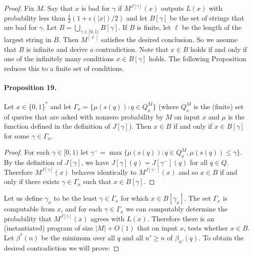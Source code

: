\documentclass[10pt,a4paper]{article}
\begin{document}
\begin{proof}
Fix $M$. Say that $x$ is bad for $\gamma$ if $M^{J[\gamma]}(x)$ outputs $L(x)$ with probability less than $\frac12(1+\epsilon(|x|)/2)$ and let $B[\gamma]$ be the set of strings that are bad for $\gamma$. Let $B=\bigcup_{\gamma\in[0,1)}B[\gamma]$.
If $B$ is finite, let $\ell$ be the length of the largest string in $B$. Then $M^{[\ell]}$ satisfies the desired conclusion. So we assume that $B$ is infinite and derive a contradiction.
Note that $x\in B$ holds if and only if one of the infinitely many conditions $x\in B[\gamma]$ holds. The following Proposition reduces this to a finite set of conditions.
\paragraph{Proposition 19.}
Let $x\in\{0,1\}^*$ and let $\Gamma_x=\{\mu(s(q)):q\in Q_x^M\}$ (where $Q_x^M$ is the (finite) set of queries that are asked with nonzero probability by $M$ on input $x$ and $\mu$ is the function defined in the definition of $J[\gamma]$). Then $x\in B$ if and only if $x\in B[\gamma]$ for some $\gamma\in\Gamma_x$.
\begin{proof}
For each $\gamma\in[0,1)$ let $\gamma^-=\max\{\mu(s(q)):q\in Q_x^M,\mu(s(q))\leq\gamma\}$. By the definition of $J[\gamma]$, we have $J[\gamma](q)=J[\gamma^-](q)$ for all $q\in Q$. Therefore $M^{J[\gamma]}(x)$ behaves identically to $M^{J[\gamma^-]}(x)$ and so $x\in B$ if and only if there exists $\gamma\in\Gamma_x$ such that $x\in B[\gamma]$.
\end{proof}
Let us define $\gamma_x$ to be the least $\gamma\in\Gamma_x$ for which $x\in B[\gamma_x]$.
The set $\Gamma_x$ is computable from $x$, and for each $\gamma\in\Gamma_x$ we can computably determine the probability that $M^{J[\gamma]}(x)$ agrees with $L(x)$. Therefore there is an (instantiated) program of size $|M|+O(1)$ that on input $x$, tests whether $x\in B$.
Let $\beta^*(n)$ be the minimum over all $q$ and all $n'\geq n$ of $\beta_{n'}(q)$. To obtain the desired contradiction we will prove:

\end{proof}
\end{document}
